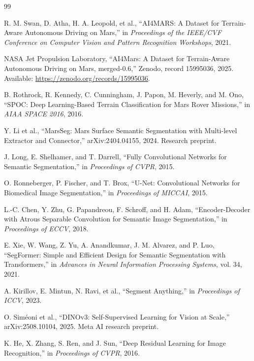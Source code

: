 \documentclass[11pt]{article}
\begin{document}
\begin{thebibliography}{99}

R. M. Swan, D. Atha, H. A. Leopold, et al., ``AI4MARS: A Dataset for Terrain-Aware Autonomous
Driving on Mars,'' in \emph{Proceedings of the IEEE/CVF Conference on Computer Vision and Pattern
Recognition Workshops}, 2021.

NASA Jet Propulsion Laboratory, ``AI4Mars: A Dataset for Terrain-Aware Autonomous Driving on Mars,
merged-0.6,'' Zenodo, record 15995036, 2025. Available:
\url{https://zenodo.org/records/15995036}.

B. Rothrock, R. Kennedy, C. Cunningham, J. Papon, M. Heverly, and M. Ono, ``SPOC: Deep
Learning-Based Terrain Classification for Mars Rover Missions,'' in \emph{AIAA SPACE 2016}, 2016.

Y. Li et al., ``MarsSeg: Mars Surface Semantic Segmentation with Multi-level Extractor and
Connector,'' arXiv:2404.04155, 2024. Research preprint.

J. Long, E. Shelhamer, and T. Darrell, ``Fully Convolutional Networks for Semantic Segmentation,''
in \emph{Proceedings of CVPR}, 2015.

O. Ronneberger, P. Fischer, and T. Brox, ``U-Net: Convolutional Networks for Biomedical Image
Segmentation,'' in \emph{Proceedings of MICCAI}, 2015.

L.-C. Chen, Y. Zhu, G. Papandreou, F. Schroff, and H. Adam, ``Encoder-Decoder with Atrous Separable
Convolution for Semantic Image Segmentation,'' in \emph{Proceedings of ECCV}, 2018.

E. Xie, W. Wang, Z. Yu, A. Anandkumar, J. M. Alvarez, and P. Luo, ``SegFormer: Simple and Efficient
Design for Semantic Segmentation with Transformers,'' in \emph{Advances in Neural Information
Processing Systems}, vol. 34, 2021.

A. Kirillov, E. Mintun, N. Ravi, et al., ``Segment Anything,'' in \emph{Proceedings of ICCV}, 2023.

O. Sim\'eoni et al., ``DINOv3: Self-Supervised Learning for Vision at Scale,'' arXiv:2508.10104,
2025. Meta AI research preprint.

K. He, X. Zhang, S. Ren, and J. Sun, ``Deep Residual Learning for Image Recognition,'' in
\emph{Proceedings of CVPR}, 2016.


\end{thebibliography}
\end{document}
